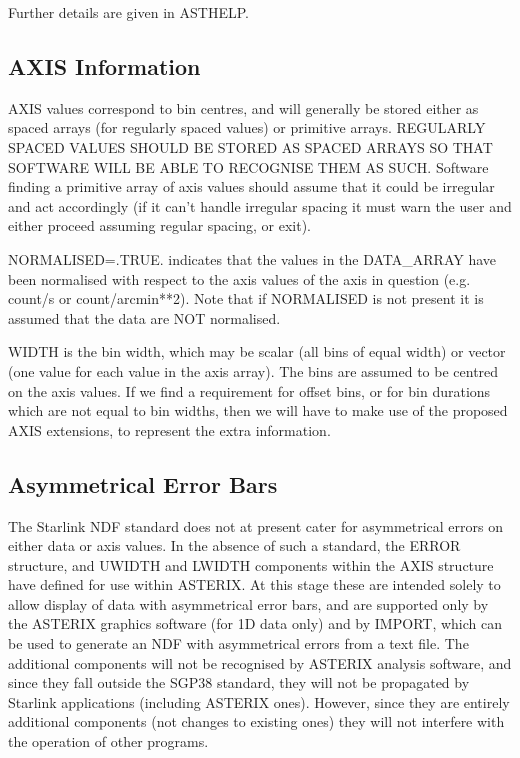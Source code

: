 Further details are given in ASTHELP.

\subsection{AXIS Information}

AXIS values correspond to bin centres, and will  generally  be  stored
either  as  spaced  arrays  (for regularly spaced values) or primitive
arrays.  REGULARLY SPACED VALUES SHOULD BE STORED AS SPACED ARRAYS  SO
THAT  SOFTWARE  WILL  BE  ABLE  TO  RECOGNISE  THEM AS SUCH.  Software
finding a primitive array of axis values should assume that  it  could
be irregular and act accordingly (if it can't handle irregular spacing
it must warn the user and either proceed assuming regular spacing,  or
exit).

NORMALISED=.TRUE.  indicates that the values in  the  DATA\_ARRAY  have
been  normalised  with  respect  to  the  axis  values  of the axis in
question (e.g.  count/s or count/arcmin**2).  Note that if  NORMALISED
is not present it is assumed that the data are NOT normalised.

WIDTH is the bin width, which may be scalar (all bins of equal  width)
or  vector (one value for each value in the axis array).  The bins are
assumed to be centred on the axis values.  If we  find  a  requirement
for  offset  bins,  or  for  bin  durations which are not equal to bin
widths, then we will have to make use of the proposed AXIS extensions,
to represent the extra information.

\subsection{Asymmetrical Error Bars}

The Starlink NDF standard does not at present cater  for  asymmetrical
errors  on  either  data  or  axis  values.   In the absence of such a
standard, the ERROR structure, and UWIDTH and LWIDTH components within
the AXIS structure have defined for use within ASTERIX.  At this stage
these are intended solely to allow display of data  with  asymmetrical
error  bars,  and  are supported only by the ASTERIX graphics software
(for 1D data only) and by IMPORT, which can be used to generate an NDF
with  asymmetrical errors from a text file.  The additional components
will not be recognised by ASTERIX analysis software,  and  since  they
fall  outside  the  SGP38  standard,  they  will  not be propagated by
Starlink applications (including ASTERIX ones).  However,  since  they
are entirely additional components (not changes to existing ones) they
will not interfere with the operation of other programs.

